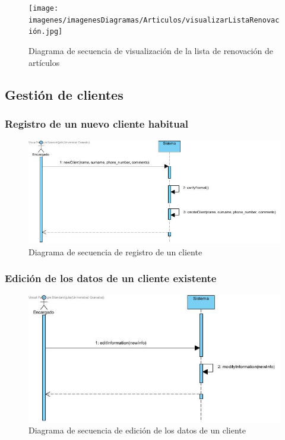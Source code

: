 \begin{figure}[H]
	\centering
	\texttt{[image: imagenes/imagenesDiagramas/Articulos/visualizarListaRenovación.jpg]}
	\caption{Diagrama de secuencia de visualización de la lista de renovación de artículos}
	\label{fig:seqdiag11}
\end{figure}

\subsection{Gestión de clientes}

\subsubsection{Registro de un nuevo cliente habitual}

\begin{figure}[H]
	\centering
	\includegraphics[width=1\textwidth]{imagenes/imagenesDiagramas/Cliente/nuevoCliente.jpg}
	\caption{Diagrama de secuencia de registro de un cliente}
	\label{fig:seqdiag12}
\end{figure}

\subsubsection{Edición de los datos de un cliente existente}

\begin{figure}[H]
	\centering
	\includegraphics[width=1\textwidth]{imagenes/imagenesDiagramas/Cliente/editarCliente.jpg}
	\caption{Diagrama de secuencia de edición de los datos de un cliente}
	\label{fig:seqdiag13}
\end{figure}

